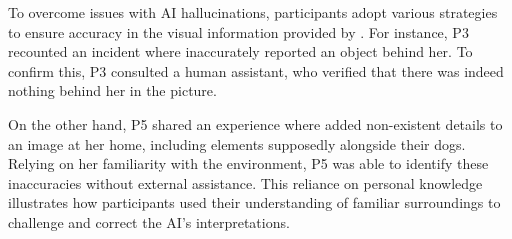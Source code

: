 


To overcome issues with AI hallucinations, participants adopt various strategies to ensure accuracy in the visual information provided by \bma. For instance, P3 recounted an incident where \bma{} inaccurately reported an object behind her. To confirm this, P3 consulted a human assistant, who verified that there was indeed nothing behind her in the picture. 

On the other hand, P5 shared an experience where \bma{} added non-existent details to an image at her home, including elements supposedly alongside their dogs. Relying on her familiarity with the environment, P5 was able to identify these inaccuracies without external assistance. This reliance on personal knowledge illustrates how participants used their understanding of familiar surroundings to challenge and correct the AI's interpretations. 












